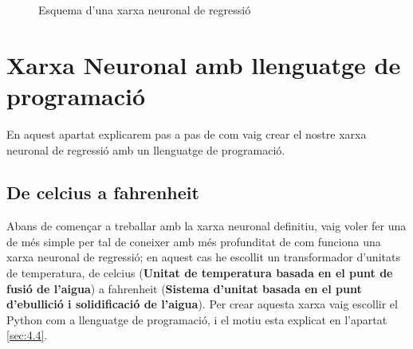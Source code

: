 \begin{figure}[h!]
\centering
{}
\caption{Esquema d’una xarxa neuronal de regressió}
\end{figure}

\section{Xarxa Neuronal amb llenguatge de programació}\label{sec:10}
En aquest apartat explicarem pas a pas de com vaig crear el nostre xarxa neuronal de regressió amb un llenguatge de programació.

\subsection{De celcius a fahrenheit}

Abans de començar a treballar amb la xarxa neuronal definitiu, vaig voler fer una de més simple per tal de coneixer amb més profunditat de com funciona una xarxa neuronal de regressió; en aquest cas he escollit un transformador d'unitats de temperatura, de celcius (\textbf{Unitat de temperatura basada en el punt de fusió de l'aigua}) a fahrenheit (\textbf{Sistema d'unitat basada en el punt d'ebullició i solidificació de l'aigua}). Per crear aquesta xarxa vaig escollir el Python com a llenguatge de programació, i el motiu esta explicat en l'apartat \ref{sec:4.4}.\\



